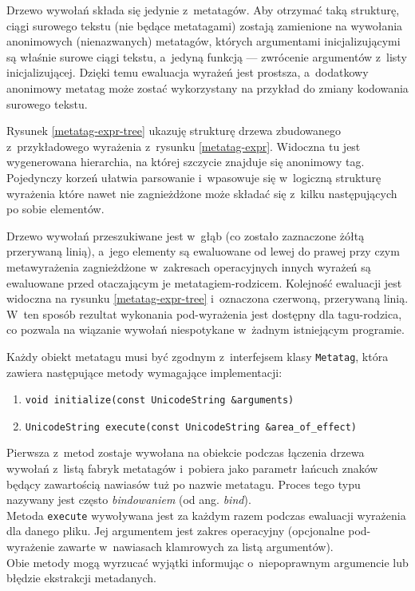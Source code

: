\par
Drzewo wywołań składa się jedynie z~metatagów. Aby otrzymać taką strukturę, ciągi surowego tekstu (nie będące metatagami) zostają zamienione na wywołania anonimowych (nienazwanych) metatagów, których argumentami inicjalizującymi są właśnie surowe ciągi tekstu, a~jedyną funkcją --- zwrócenie argumentów z~listy inicjalizującej. Dzięki temu ewaluacja wyrażeń jest prostsza, a~dodatkowy anonimowy metatag może zostać wykorzystany na przykład do zmiany kodowania surowego tekstu.
\par
Rysunek \ref{metatag-expr-tree} ukazuję strukturę drzewa zbudowanego z~przykładowego wyrażenia z~rysunku \ref{metatag-expr}. Widoczna tu jest wygenerowana hierarchia, na której szczycie znajduje się anonimowy tag. Pojedynczy korzeń ułatwia parsowanie i~wpasowuje się w~logiczną strukturę wyrażenia które nawet nie zagnieżdżone może składać się z~kilku następujących po sobie elementów.
\par
Drzewo wywołań przeszukiwane jest w~głąb (co zostało zaznaczone żółtą przerywaną linią), a~jego elementy są ewaluowane od lewej do prawej przy czym metawyrażenia zagnieżdżone w~zakresach operacyjnych innych wyrażeń są ewaluowane przed otaczającym je metatagiem-rodzicem. Kolejność ewaluacji jest widoczna na rysunku \ref{metatag-expr-tree} i~oznaczona czerwoną, przerywaną linią. W~ten sposób rezultat wykonania pod-wyrażenia jest dostępny dla tagu-rodzica, co pozwala na wiązanie wywołań niespotykane w~żadnym istniejącym programie.
\par
Każdy obiekt metatagu musi być zgodnym z~interfejsem klasy \texttt{Metatag}, która zawiera następujące metody wymagające implementacji:
\begin{enumerate}
\item \texttt{void initialize(const UnicodeString \&arguments)}
\item \texttt{UnicodeString execute(const UnicodeString \&area\_of\_effect)}
\end{enumerate}

Pierwsza z~metod zostaje wywołana na obiekcie podczas łączenia drzewa wywołań z~listą fabryk metatagów i~pobiera jako parametr łańcuch znaków będący zawartością nawiasów tuż po nazwie metatagu. Proces tego typu nazywany jest często \textit{bindowaniem} (od ang. \textit{bind}).\\
Metoda \texttt{execute} wywoływana jest za każdym razem podczas ewaluacji wyrażenia dla danego pliku. Jej argumentem jest zakres operacyjny (opcjonalne pod-wyrażenie zawarte w~nawiasach klamrowych za listą argumentów).\\
Obie metody mogą wyrzucać wyjątki informując o~niepoprawnym argumencie lub błędzie ekstrakcji metadanych.

